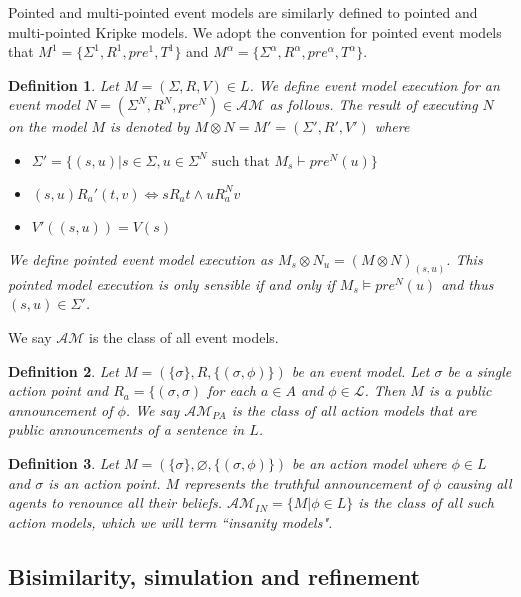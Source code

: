 \documentclass[12pt, a4paper, titlepage]{scrartcl}
\newtheorem{defn}{Definition}[section]
\numberwithin{equation}{section}
\newcommand{\eventClass}{\mathcal{AM}}
\newcommand{\insaneClass}{\eventClass_{IN}}
\newcommand{\publicAnnClass}{\eventClass_{PA}}
\begin{document}
Pointed and multi-pointed event models are similarly defined to pointed and multi-pointed Kripke
models.
We adopt the convention for pointed event models that $M^1 = \{\Sigma^1, R^1,
pre^1, T^1\}$ and $M^\alpha = \{\Sigma^\alpha,R^\alpha,pre^\alpha,T^\alpha\}$.

\begin{defn} \label{evModelEx}
Let $M = (\Sigma, R, V) \in L$. We define event model execution for an event model $N = (\Sigma^N,
		R^N, pre^N) \in
\mathcal{AM}$ as follows.
The result of executing $N$ on the model $M$ is denoted by $M \otimes N = M' = (\Sigma', R', V')$ where
\begin{itemize}
	\item $\Sigma' = \{(s,u) | s \in \Sigma, u \in \Sigma^N \text{ such that } M_s \vdash pre^N(u)\}$
	\item $(s, u) R_a' (t, v) \iff s R_a t \land u R_a^N v$
	\item $V'((s,u)) = V(s)$
\end{itemize}
We define pointed event model execution as $M_s \otimes N_u = (M \otimes N)_{(s, u)}$.
This pointed model execution is only sensible if and only if $M_s \models pre^N(u)$ and thus $(s,u)
	\in \Sigma'$.
\end{defn}

We say $\eventClass$ is the class of all event models.

\begin{defn} \label{pub}
Let $M = (\{ \sigma \}, R, \{ (\sigma, \phi)\})$ be an event model.
Let $\sigma$ be a single action point and $R_a = \{(\sigma, \sigma)$ for each $a \in A$ and $\phi
\in \mathcal{L}$.
Then $M$ is a public announcement of $\phi$.
We say $\publicAnnClass$ is the class of all action models that
are public announcements of a sentence in $L$.
\end{defn}

\begin{defn} \label{insanity}
Let $M = (\{ \sigma \}, \varnothing, \{(\sigma, \phi)\}) $ be an action model
where $\phi \in L$ and $\sigma$ is an action point.
$M$ represents the truthful announcement of $\phi$ causing all agents to renounce all their beliefs.
$\insaneClass = \{M | \phi \in L\}$ is the class of all such action models,
which we will term ``insanity models".
\end{defn}

\subsection{Bisimilarity, simulation and refinement}
\end{document}
